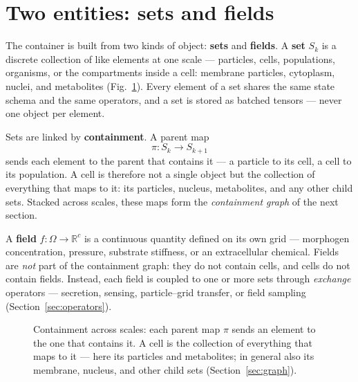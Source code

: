 \documentclass[11pt]{article}
\begin{document}
\section{Two entities: sets and fields}
\label{sec:entities}

The container is built from two kinds of object: \textbf{sets} and \textbf{fields}.
A \textbf{set} $S_k$ is a discrete collection of like elements at one scale ---
particles, cells, populations, organisms, or the compartments inside a cell:
membrane particles, cytoplasm, nuclei, and metabolites (Fig.~\ref{fig:hier}). Every
element of a set shares the same state schema and the same operators, and a set is
stored as batched tensors --- never one object per element.

Sets are linked by \textbf{containment}. A parent map
\[
  \pi : S_k \longrightarrow S_{k+1}
\]
sends each element to the parent that contains it --- a particle to its cell, a
cell to its population. A cell is therefore not a single object but the collection
of everything that maps to it: its particles, nucleus, metabolites, and any other
child sets. Stacked across scales, these maps form the \emph{containment graph} of
the next section.

A \textbf{field} $f:\Omega\to\mathbb{R}^c$ is a continuous quantity defined on its
own grid --- morphogen concentration, pressure, substrate stiffness, or an
extracellular chemical. Fields are \emph{not} part of the containment graph: they
do not contain cells, and cells do not contain fields. Instead, each field is
coupled to one or more sets through \emph{exchange} operators --- secretion,
sensing, particle--grid transfer, or field sampling (Section~\ref{sec:operators}).

\begin{figure}[h]
\centering
{}
\caption{Containment across scales: each parent map $\pi$ sends an element to the
one that contains it. A cell is the collection of everything that maps to it ---
here its particles and metabolites; in general also its membrane, nucleus, and
other child sets (Section~\ref{sec:graph}).}
\label{fig:hier}
\end{figure}
\end{document}
